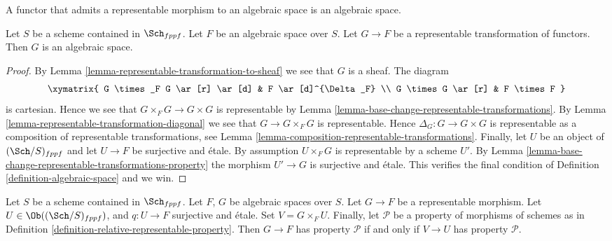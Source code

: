 \begin{lemma}
\label{lemma-representable-over-space}
\begin{slogan}
A functor that admits a representable morphism to an algebraic space is
an algebraic space.
\end{slogan}
Let $S$ be a scheme contained in $\Sch_{fppf}$.
Let $F$ be an algebraic space over $S$.
Let $G \to F$ be a representable transformation of functors.
Then $G$ is an algebraic space.
\end{lemma}

\begin{proof}
By Lemma \ref{lemma-representable-transformation-to-sheaf}
we see that $G$ is a sheaf. The diagram
$$
\xymatrix{
G \times_F G \ar[r] \ar[d] & F \ar[d]^{\Delta_F} \\
G \times G \ar[r] & F \times F
}
$$
is cartesian. Hence we see that $G \times_F G \to G \times G$
is representable by
Lemma \ref{lemma-base-change-representable-transformations}.
By
Lemma \ref{lemma-representable-transformation-diagonal}
we see that $G \to G \times_F G$ is representable.
Hence $\Delta_G : G \to G \times G$ is representable as a composition
of representable transformations, see
Lemma \ref{lemma-composition-representable-transformations}.
Finally, let $U$ be an object of $(\Sch/S)_{fppf}$
and let $U \to F$ be surjective and \'etale. By assumption
$U \times_F G$ is representable by a scheme $U'$. By
Lemma \ref{lemma-base-change-representable-transformations-property}
the morphism $U' \to G$ is surjective and \'etale. This verifies
the final condition of Definition \ref{definition-algebraic-space} and we win.
\end{proof}

\begin{lemma}
\label{lemma-representable-morphisms-spaces-property}
Let $S$ be a scheme contained in $\Sch_{fppf}$.
Let $F$, $G$ be algebraic spaces over $S$.
Let $G \to F$ be a representable morphism.
Let $U \in \Ob((\Sch/S)_{fppf})$, and $q : U \to F$
surjective and \'etale. Set $V = G \times_F U$.
Finally, let $\mathcal{P}$ be a property of morphisms
of schemes as in Definition \ref{definition-relative-representable-property}.
Then $G \to F$ has property $\mathcal{P}$ if and only if
$V \to U$ has property $\mathcal{P}$.
\end{lemma}

